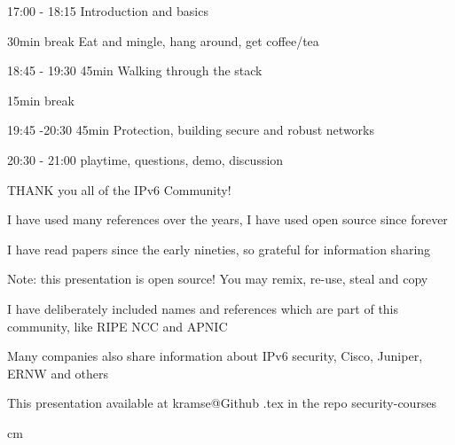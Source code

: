 \documentclass[Screen16to9,17pt]{foils}
\begin{document}


\begin{list2}
\item 17:00 - 18:15  Introduction and basics\\

\item 30min break  Eat and mingle, hang around, get coffee/tea\\

\item 18:45 - 19:30 45min Walking through the stack\\

\item 15min break\\

\item 19:45 -20:30 45min Protection, building secure and robust networks\\

\item 20:30 - 21:00 playtime, questions, demo, discussion
\end{list2}

\hlkprofiluk



\slide{}


\centerline{THANK you all of the IPv6 Community!}

\begin{list2}
\item I have used many references over the years, I have used open source since forever
\item I have read papers since the early nineties, so grateful for information sharing
\item Note: this presentation is open source! You may remix, re-use, steal and copy
\item I have deliberately included names and references which are part of this community, like RIPE NCC and APNIC
\item Many companies also share information about IPv6 security, Cisco, Juniper, ERNW and others
\item This presentation available at kramse@Github \jobname.tex in the repo security-courses
\end{list2}

 cm
\end{document}
